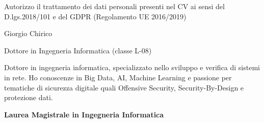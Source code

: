 \documentclass[a4paper]{letter}
\begin{document}
\begin{minipage}[t]{0.65\textwidth}
\setlength{\baselineskip}{1.4\baselineskip}

{\tiny Autorizzo il trattamento dei dati personali presenti nel CV ai sensi del D.lgs.2018/101 e del GDPR (Regolamento UE 2016/2019)}
\vspace{0.3cm}


{\huge Giorgio Chirico}

{\large Dottore in Ingegneria Informatica (classe L-08)}

\vspace{0.5cm}
 
Dottore in ingegneria informatica, specializzato nello sviluppo e verifica di sistemi in rete. Ho conoscenze in Big Data, AI, Machine Learning e passione per tematiche di sicurezza digitale quali Offensive Security, Security-By-Design e protezione dati.


\vspace{0.15cm}

\makeatletter
\newcommand{\FormazioneBox}{%
}
\makeatother

\FormazioneBox

\vspace{0.8 cm}

{\large \textbf{Laurea Magistrale in Ingegneria Informatica}}


\end{minipage}
\end{document}
